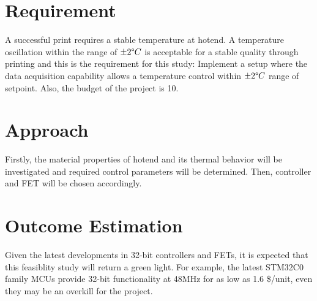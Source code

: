 \documentclass[12pt,a4paper]{report}
\begin{document}
    \section*{Requirement}

    A successful print requires a stable temperature at hotend. A temperature
    oscillation within the range of $\pm2\degree C$ is acceptable for a stable
    quality through printing and this is the requirement for this study:
    Implement a setup where the data acquisition capability allows a
    temperature control within $\pm2\degree C$ range of setpoint. Also, the
    budget of the project is 10\texteuro.

    \section*{Approach}

    Firstly, the material properties of hotend and its thermal behavior will be
    investigated and required control parameters will be determined. Then,
    controller and FET will be chosen accordingly.

    \section*{Outcome Estimation}

    Given the latest developments in 32-bit controllers and FETs, it is
    expected that this feasiblity study will return a green light. For example,
    the latest STM32C0 family MCUs provide 32-bit functionality at 48MHz for
    as low as 1.6 \$/unit, even they may be an overkill for the project.
\end{document}
